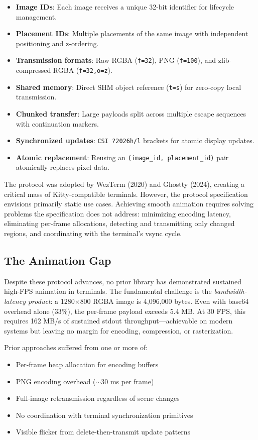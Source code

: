 \documentclass[11pt, a4paper, twocolumn]{article}
\begin{document}
\begin{itemize}[leftmargin=1.2em, itemsep=0.1em]
    \item \textbf{Image IDs}: Each image receives a unique 32-bit identifier for lifecycle management.
    \item \textbf{Placement IDs}: Multiple placements of the same image with independent positioning and z-ordering.
    \item \textbf{Transmission formats}: Raw RGBA (\texttt{f=32}), PNG (\texttt{f=100}), and zlib-compressed RGBA (\texttt{f=32,o=z}).
    \item \textbf{Shared memory}: Direct SHM object reference (\texttt{t=s}) for zero-copy local transmission.
    \item \textbf{Chunked transfer}: Large payloads split across multiple escape sequences with continuation markers.
    \item \textbf{Synchronized updates}: \texttt{CSI ?2026h/l} brackets for atomic display updates.
    \item \textbf{Atomic replacement}: Reusing an \texttt{(image\_id, placement\_id)} pair atomically replaces pixel data.
\end{itemize}

The protocol was adopted by WezTerm (2020) and Ghostty (2024), creating a critical mass of Kitty-compatible terminals.
However, the protocol specification envisions primarily static use cases.
Achieving smooth animation requires solving problems the specification does not address: minimizing encoding latency, eliminating per-frame allocations, detecting and transmitting only changed regions, and coordinating with the terminal's vsync cycle.

\subsection{The Animation Gap}

Despite these protocol advances, no prior library has demonstrated sustained high-FPS animation in terminals.
The fundamental challenge is the \emph{bandwidth-latency product}: a 1280$\times$800 RGBA image is 4,096,000 bytes.
Even with base64 overhead alone (33\%), the per-frame payload exceeds 5.4 MB.
At 30 FPS, this requires 162 MB/s of sustained stdout throughput---achievable on modern systems but leaving no margin for encoding, compression, or rasterization.

Prior approaches suffered from one or more of:
\begin{itemize}[leftmargin=1.2em, itemsep=0.1em]
    \item Per-frame heap allocation for encoding buffers
    \item PNG encoding overhead ($\sim$30 ms per frame)
    \item Full-image retransmission regardless of scene changes
    \item No coordination with terminal synchronization primitives
    \item Visible flicker from delete-then-transmit update patterns
\end{itemize}
\end{document}
